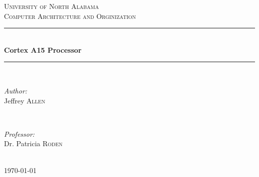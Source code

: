 \documentclass[12pt]{scrreprt}
\begin{document}
 

\begin{titlepage}

\newcommand{\HRule}{\rule{\linewidth}{0.5mm}} %

\center %


\textsc{\LARGE University of North Alabama}\\[1.5cm] %
\textsc{\Large Computer Architecture and Orginization}\\[0.5cm] %


\HRule \\[0.4cm]
{ \huge \bfseries Cortex A15 Processor}\\[0.4cm] %
\HRule \\[1.5cm]
 

\begin{minipage}{0.4\textwidth}
\begin{flushleft} \large
\emph{Author:}\\
Jeffrey \textsc{Allen}
\end{flushleft}
\end{minipage}
~
\begin{minipage}{0.4\textwidth}
\begin{flushright} \large
\emph{Professor:} \\
Dr. Patricia \textsc{Roden}
\end{flushright}
\end{minipage}\\[4cm]

{\large \today}\\[3cm] %

\vfill %

\end{titlepage}
\end{document}
